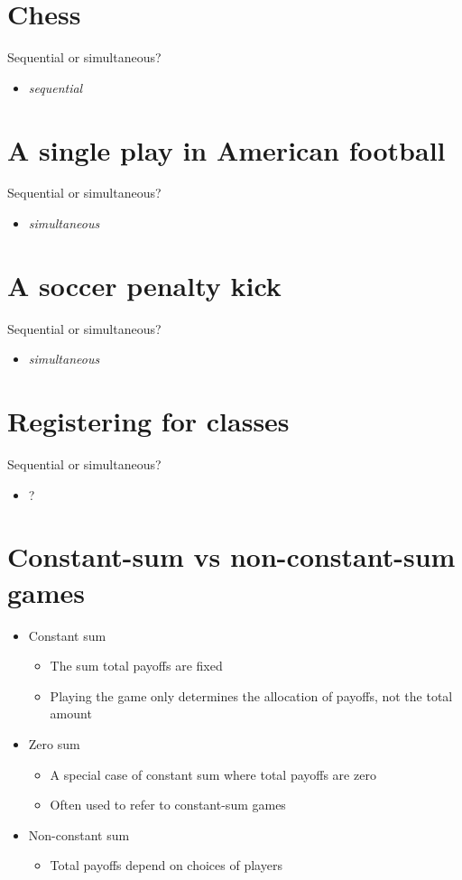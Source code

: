 \documentclass[11pt]{article}
\begin{document}
\section*{Chess}
\label{sec:orgb6c0147}
Sequential or simultaneous?
\begin{itemize}
\item \emph{sequential}
\end{itemize}

\section*{A single play in American football}
\label{sec:orga3d2e6f}
Sequential or simultaneous?
\begin{itemize}
\item \emph{simultaneous}
\end{itemize}

\section*{A soccer penalty kick}
\label{sec:orgb003eaf}
Sequential or simultaneous?
\begin{itemize}
\item \emph{simultaneous}
\end{itemize}

\section*{Registering for classes}
\label{sec:orgc736159}
Sequential or simultaneous?
\begin{itemize}
\item ?
\end{itemize}

\section*{Constant-sum vs non-constant-sum games}
\label{sec:org4834a42}
\begin{itemize}
\item Constant sum
\begin{itemize}
\item The sum total payoffs are fixed
\item Playing the game only determines the allocation of payoffs, not the total amount
\end{itemize}
\item Zero sum
\begin{itemize}
\item A special case of constant sum where total payoffs are zero
\item Often used to refer to constant-sum games
\end{itemize}
\item Non-constant sum
\begin{itemize}
\item Total payoffs depend on choices of players
\end{itemize}
\end{itemize}
\end{document}
